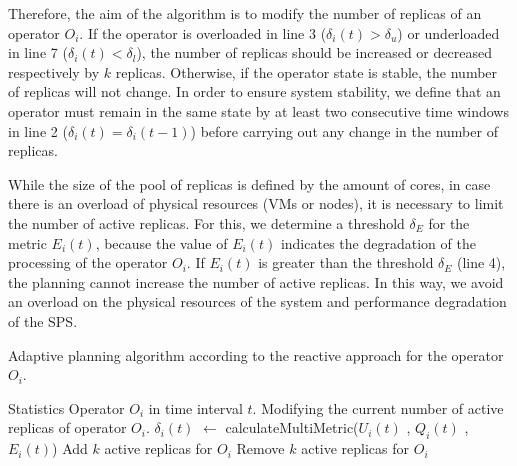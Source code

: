 Therefore, the aim of the algorithm is to modify the number of replicas of an operator $O_i$. If the operator is overloaded in line 3 ($\delta_i(t) > \delta_u$) or underloaded in line 7 ($\delta_i(t) < \delta_l$), the number of replicas should be increased or decreased respectively by $k$ replicas. Otherwise, if the operator state is stable, the number of replicas will not change. In order to ensure system stability, we define that an operator must remain in the same state by at least two consecutive time windows in line 2 ($\delta_i(t) = \delta_i(t-1)$) before carrying out any change in the number of replicas.

While the size of the pool of replicas is defined by the amount of cores, in case there is an overload of physical resources (VMs or nodes), it is necessary to limit the number of active replicas. For this, we determine a threshold $\delta_{E}$ for the metric $E_i(t)$, because the value of $E_i(t)$ indicates the degradation of the processing of the operator $O_i$. If $E_i(t)$ is greater than the threshold $\delta_{E}$ (line 4), the planning cannot increase the number of active replicas. In this way, we avoid an overload on the physical resources of the system and performance degradation of the SPS.

\begin{algorithm}[!ht]
 \caption{Adaptive planning algorithm according to the reactive approach for the operator $O_i$.}
 \begin{algorithmic}[1]
 	\REQUIRE Statistics Operator $O_i$ in time interval $t$.
 	\ENSURE Modifying the current number of active replicas of operator $O_i$.
	\STATE $\delta_i(t)$ $\gets$ calculateMultiMetric($U_i(t)$ , $Q_i(t)$ , $E_i(t)$)
				\STATE Add $k$ active replicas for $O_i$
			\ENDIF 
			\STATE Remove $k$ active replicas for $O_i$
		\ENDIF
	\ENDIF
\end{algorithmic}
\label{alg:rsps-planning}
\end{algorithm}